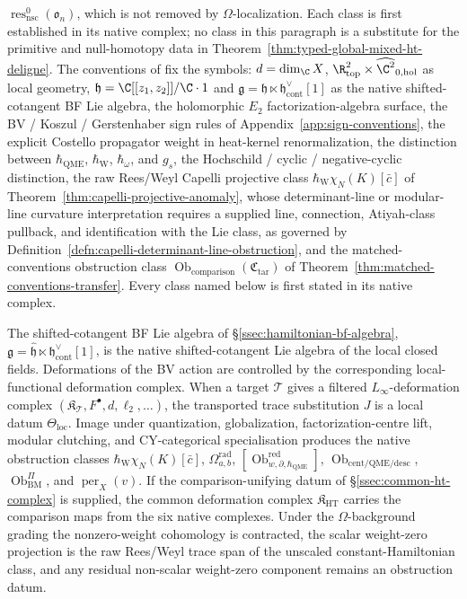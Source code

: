 \(\operatorname{res}^{0}_{\mathrm{nsc}}(\mathfrak o_n)\), which is not
removed by \(\Omega\)-localization.  Each class is first established in
its native complex; no class in this paragraph is a substitute for the
primitive and null-homotopy data in
Theorem~\ref{thm:typed-global-mixed-ht-deligne}.  The
conventions of
 fix the symbols:
\(d=\dim_\C X\),
\(\R^2_{\mathrm{top}}\times\widehat{\C^2}_{0,\mathrm{hol}}\) as
local geometry, \(\mathfrak h=\C[[z_1,z_2]]/\C\cdot 1\) and
\(\mathfrak g=\mathfrak h\ltimes\mathfrak h^\vee_{\mathrm{cont}}[1]\)
as the native shifted-cotangent BF Lie algebra, the holomorphic
\(E_2\) factorization-algebra surface, the BV / Koszul /
Gerstenhaber sign rules of
Appendix~\ref{app:sign-conventions}, the explicit Costello
propagator weight in heat-kernel renormalization, the distinction
between \(\hbar_{\mathrm{QME}}\), \(\hbar_{\mathrm{W}}\),
\(\hbar_\omega\), and \(g_s\), the Hochschild / cyclic /
negative-cyclic distinction, the raw Rees/Weyl Capelli projective class
\(\hbar_{\mathrm{W}}\chi_N(K)[\bar c]\) of
Theorem~\ref{thm:capelli-projective-anomaly}, whose
determinant-line or modular-line curvature interpretation requires a
supplied line, connection, Atiyah-class pullback, and identification
with the Lie class, as governed by
Definition~\ref{defn:capelli-determinant-line-obstruction}, and the
matched-conventions obstruction class
\(\operatorname{Ob}_{\mathrm{comparison}}(\mathfrak C_{\mathrm{tar}})\) of
Theorem~\ref{thm:matched-conventions-transfer}.  Every class named
below is first stated in its native complex.

The shifted-cotangent BF Lie algebra of
\S\ref{ssec:hamiltonian-bf-algebra},
\(\mathfrak g=\widehat{\mathfrak h}\ltimes\mathfrak h^\vee_{\mathrm{cont}}[1]\),
is the native shifted-cotangent Lie algebra of the local closed fields.
Deformations of the BV action are controlled by the corresponding
local-functional deformation complex.  When a target
\(\mathcal T\) gives a filtered \(L_\infty\)-deformation complex
\((\mathfrak K_{\mathcal T},F^\bullet,d,\ell_2,\ldots)\), the
transported trace substitution \(J\) is a local datum
\(\Theta_{\mathrm{loc}}\).  Image under quantization, globalization,
factorization-centre lift, modular clutching, and CY-categorical
specialisation produces the native obstruction classes
\(\hbar_{\mathrm{W}}\chi_N(K)[\bar c]\),
\(\Omega^{\mathrm{rad}}_{a,b}\),
\([\operatorname{Ob}^{\mathrm{red}}_{w,\partial,\hbar_{\mathrm{QME}}}]\),
\(\operatorname{Ob}_{\mathrm{cent/QME/desc}}\),
\(\operatorname{Ob}^{\Pi}_{\mathrm{BM}}\), and
\(\operatorname{per}_X(v)\).  If the comparison-unifying datum of
\S\ref{ssec:common-ht-complex} is supplied, the common deformation
complex \(\mathfrak K_{\mathrm{HT}}\) carries the comparison maps from
the six native complexes.  Under the \(\Omega\)-background grading the
nonzero-weight cohomology is contracted, the scalar weight-zero
projection is the raw Rees/Weyl trace span of the unscaled
constant-Hamiltonian class, and any residual non-scalar
weight-zero component remains an obstruction datum.

